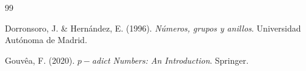 \documentclass[12pt,a4paper,openany]{book} %
\begin{document}
	\appendix
	\chapter{}
	
\backmatter
	\begin{thebibliography}{99}
		
		Dorronsoro, J. \& Hernández, E. (1996).
		\textit{Números, grupos y anillos}.
		Universidad Autónoma de Madrid.
		
		Gouvêa, F. (2020). \textit{$p-$adict Numbers: An Introduction}. Springer. 
			
		
	\end{thebibliography}
	
	
\end{document}
